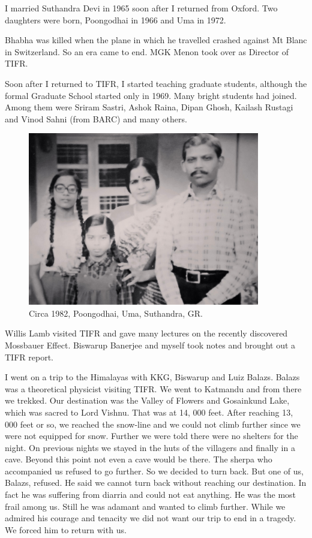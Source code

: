 I married Suthandra Devi in 1965 soon after I 
returned from Oxford. Two daughters were born, Poongodhai in 1966 and 
Uma in 1972.

Bhabha was killed when the plane in which he travelled crashed against 
Mt Blanc in Switzerland. So an era came to end. MGK Menon took over as 
Director of TIFR.

Soon after I returned to TIFR, I started teaching graduate students, 
although the formal Graduate School started only in 1969. Many bright 
students had joined. Among them were Sriram Sastri, Ashok Raina, Dipan 
Ghosh, Kailash Rustagi and Vinod Sahni (from BARC) and many others.
\eject

\begin{figure}[H]
\centering
\includegraphics[width=0.9\textwidth]{images/Rajaji-03.jpg}
\caption{ Circa 1982, Poongodhai, Uma, Suthandra, GR.}
\end{figure}

Willis Lamb visited TIFR and gave many lectures on the recently 
discovered Mossbauer Effect. Biswarup Banerjee and myself took notes and 
brought out a TIFR report.
                 
I went on a trip to the Himalayas with KKG, Biswarup and Luiz Balazs. 
Balazs was a theoretical physicist visiting TIFR. We went to Katmandu 
and from there we trekked. Our destination was the Valley of Flowers and 
Gosainkund Lake, which was sacred to Lord Vishnu. That was at 14, 000 
feet. After reaching 13, 000 feet or so, we reached the snow-line and we 
could not climb further since we were not equipped for snow. Further we 
were told there were no shelters for the night. On previous nights we 
stayed in the huts of the villagers and finally in a cave. Beyond this 
point not even a cave would be there. The sherpa who accompanied us 
refused to go further. So we decided to turn back. But one of us, 
Balazs, refused. He said we cannot turn back without reaching our 
destination. In fact he was suffering from diarria and could not eat 
anything. He was the most frail among us. Still he was adamant and 
wanted to climb further. While we admired his courage and tenacity we 
did not want our trip to end in a tragedy. We forced him to return with 
us.
\eject

